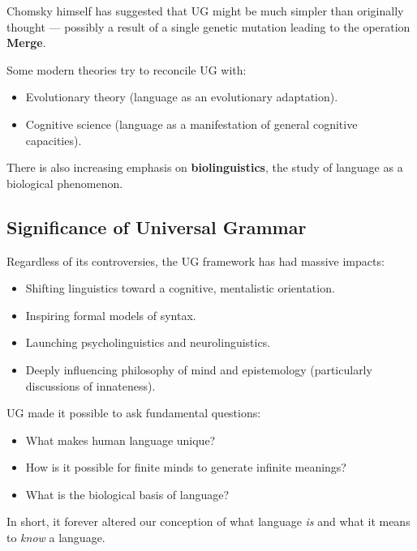 \documentclass[12pt]{article}
\newcommand{\tightlist}{\itemsep 0pt\parskip 0pt\parsep 0pt}
\begin{document}
Chomsky himself has suggested that UG might be much simpler than
originally thought --- possibly a result of a single genetic mutation
leading to the operation \textbf{Merge}.

Some modern theories try to reconcile UG with:

\begin{itemize}
\tightlist
\item
  Evolutionary theory (language as an evolutionary adaptation).
\item
  Cognitive science (language as a manifestation of general cognitive
  capacities).
\end{itemize}

There is also increasing emphasis on \textbf{biolinguistics}, the study
of language as a biological phenomenon.

\hypertarget{significance-of-universal-grammar}{%
\subsection{Significance of Universal
Grammar}\label{significance-of-universal-grammar}}

Regardless of its controversies, the UG framework has had massive
impacts:

\begin{itemize}
\tightlist
\item
  Shifting linguistics toward a cognitive, mentalistic orientation.
\item
  Inspiring formal models of syntax.
\item
  Launching psycholinguistics and neurolinguistics.
\item
  Deeply influencing philosophy of mind and epistemology (particularly
  discussions of innateness).
\end{itemize}

UG made it possible to ask fundamental questions:

\begin{itemize}
\tightlist
\item
  What makes human language unique?
\item
  How is it possible for finite minds to generate infinite meanings?
\item
  What is the biological basis of language?
\end{itemize}

In short, it forever altered our conception of what language \emph{is}
and what it means to \emph{know} a language.
\end{document}
